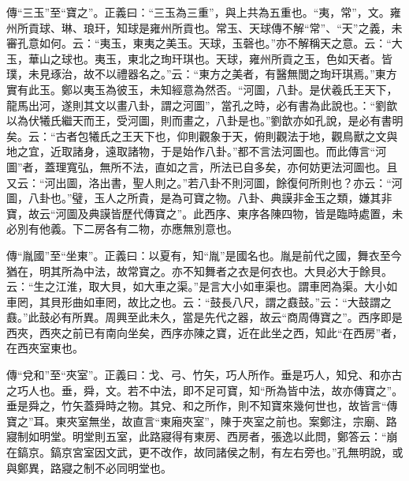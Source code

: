 {\noindent\zhuan{}\fzbyks 傳“三玉”至“寶之”。正義曰：“三玉為三重”，與上共為五重也。“夷，常”，文。雍州所貢球、琳、琅玕，知球是雍州所貢也。常玉、天球傳不解“常”、“天”之義，未審孔意如何。云：“夷玉，東夷之美玉。天球，玉磬也。”亦不解稱天之意。云：“大玉，華山之球也。夷玉，東北之珣玕琪也。天球，雍州所貢之玉，色如天者。皆璞，未見琢治，故不以禮器名之。”云：“東方之美者，有醫無閭之珣玕琪焉。”東方實有此玉。鄭以夷玉為彼玉，未知經意為然否。“河圖，八卦。是伏羲氏王天下，龍馬出河，遂則其文以畫八卦，謂之河圖”，當孔之時，必有書為此說也。：“劉歆以為伏犧氏繼天而王，受河圖，則而畫之，八卦是也。”劉歆亦如孔說，是必有書明矣。云：“古者包犧氏之王天下也，仰則觀象于天，俯則觀法于地，觀鳥獸之文與地之宜，近取諸身，遠取諸物，于是始作八卦。”都不言法河圖也。而此傳言“河圖”者，蓋理寬弘，無所不法，直如之言，所法已自多矣，亦何妨更法河圖也。且又云：“河出圖，洛出書，聖人則之。”若八卦不則河圖，餘復何所則也？亦云：“河圖，八卦也。”璧，玉人之所貴，是為可寶之物。八卦、典謨非金玉之類，嫌其非寶，故云“河圖及典謨皆歷代傳寶之”。此西序、東序各陳四物，皆是臨時處置，未必別有他義。下二房各有二物，亦應無別意也。 \par}

{\noindent\zhuan{}\fzbyks 傳“胤國”至“坐東”。正義曰：以夏有，知“胤”是國名也。胤是前代之國，舞衣至今猶在，明其所為中法，故常寶之。亦不知舞者之衣是何衣也。大貝必大于餘貝。云：“生之江淮，取大貝，如大車之渠。”是言大小如車渠也。謂車罔為渠。大小如車罔，其貝形曲如車罔，故比之也。云：“鼓長八尺，謂之鼖鼓。”云：“大鼓謂之鼖。”此鼓必有所異。周興至此未久，當是先代之器，故云“商周傳寶之”。西序即是西夾，西夾之前已有南向坐矣，西序亦陳之寶，近在此坐之西，知此“在西房”者，在西夾室東也。 \par}

{\noindent\zhuan{}\fzbyks 傳“兌和”至“夾室”。正義曰：戈、弓、竹矢，巧人所作。垂是巧人，知兌、和亦古之巧人也。垂，舜，文。若不中法，即不足可寶，知“所為皆中法，故亦傳寶之”。垂是舜之，竹矢蓋舜時之物。其兌、和之所作，則不知寶來幾何世也，故皆言“傳寶之”耳。東夾室無坐，故直言“東廂夾室”，陳于夾室之前也。案鄭注，宗廟、路寢制如明堂。明堂則五室，此路寢得有東房、西房者，張逸以此問，鄭答云：“崩在鎬京。鎬京宮室因文武，更不改作，故同諸侯之制，有左右旁也。”孔無明說，或與鄭異，路寢之制不必同明堂也。 \par}

